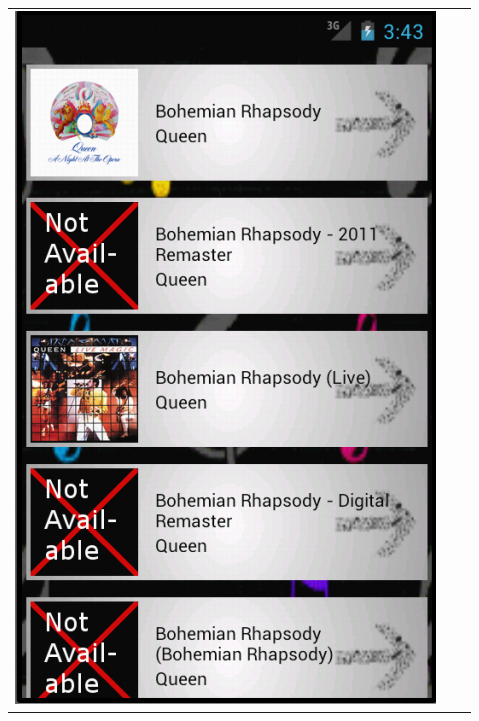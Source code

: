 \documentclass[11pt,a4paper]{article}
\begin{document}
\begin{tabular}{l l l}
	\includegraphics[scale=0.4]{GUI_0124_results.png} &

\end{tabular}
\end{document}
